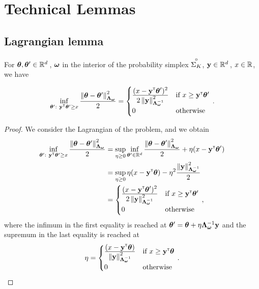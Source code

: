 \section{Technical Lemmas}\label{app:lgc.lemmas}

\subsection{Lagrangian lemma}\label{app:lgc.lemmas.lagrange}

\begin{lemma}\label{lemma:lgc.lagrange_alternative}
For $\btheta, \btheta' \in \R^d\,$, $\bomega$ in the interior of the probability simplex $\interior{\Sigma_K}$, $\by\in\R^d\,$, $x\in\R$, we have

\begin{align*}
    \inf_{\btheta':\ \by\transpose\btheta' \geq x} \frac{\normm{\btheta-\btheta'}^2_{\bLambda_{\bomega}}}{2} = 
    \begin{cases}
        \ddfrac{(x - \by\transpose\btheta')^2}{2 \normm{\by}_{\bLambda_{\bomega}^{-1}}^2} &\text{if } x \geq \by\transpose\btheta' \\
        0 &\text{otherwise}
    \end{cases}\,.
\end{align*}
\end{lemma}

\begin{proof}
We consider the Lagrangian of the problem, and we obtain
\begin{align*}
  \inf_{\btheta':\ \by\transpose\btheta' \geq x} \frac{\normm{\btheta-\btheta'}^2_{\bLambda_{\bomega}}}{2}
  &= \sup_{\eta \geq 0}\inf_{\btheta' \in \R^d} \ddfrac{\normm{\btheta-\btheta'}^2_{\bLambda_{\bomega}}}{2}+ \eta (x-\by\transpose\btheta')\\
  &=  \sup_{\eta \geq 0} \eta (x-\by\transpose\btheta) - \eta^2 \frac{\normm{\by}^2_{\bLambda_{\bomega}^{-1}}}{2}\\
  &= \begin{cases}
    \ddfrac{(x - \by\transpose\btheta')^2}{2 \normm{\by}_{\bLambda_{\bomega}^{-1}}^2} &\text{if } x \geq \by\transpose\btheta' \\
    0 &\text{otherwise}
    \end{cases}\,,
\end{align*}
where the infimum in the first equality is reached at $\btheta' = \btheta + \eta \bLambda_{\bomega}^{-1} \by$ and the supremum in the last equality is reached at
\[
    \eta =
    \begin{cases}
        \ddfrac{(x- \by\transpose\btheta)}{\normm{\by}_{\bLambda_{\bomega}^{-1}}^2} &\text{if } x \geq \by\transpose\btheta \\
        0 &\text{otherwise}
    \end{cases}\,.
\]
\end{proof}

